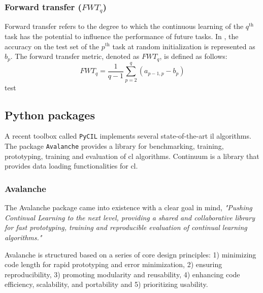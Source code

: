 \subsubsection{Forward transfer ($FWT_{q}$)}
Forward transfer refers to the degree to which the continuous learning of the $q^{\text{th}}$ task has the potential to influence the performance of future tasks. In \citep{lopez2017gradient}, the accuracy on the test set of the $p^{\text{th}}$ task at random initialization is represented as $b_{p}$. The forward transfer metric, denoted as $FWT_{q}$, is defined as follows: \begin{equation} FWT_{q} = \frac{1}{q-1} \sum_{p=2}^{q} (a_{p-1,p} - b_{p}) \end{equation}
\citep{wang2023comprehensive}test

\subsection{Python packages}
A recent toolbox called \verb|PyCIL| \citep{zhou2023class, zhou2023pycil} implements several state-of-the-art \acrshort{il} algorithms. The package \verb|Avalanche| \citep{lomonaco2021avalanche} provides a library for benchmarking, training, prototyping, training and evaluation of \acrshort{cl} algorithms. Continuum \citep{douillardlesort2021continuum} is a library that provides data loading functionalities for \acrshort{cl}. 

\subsubsection{Avalanche}
\label{sec:avalanche}
The Avalanche package came into existence with a clear goal in mind, \textit{"Pushing Continual Learning to the next level, providing a shared and collaborative library for fast prototyping, training and reproducible evaluation of continual learning algorithms."} \citep{avalancheContinualAIFiveMinutes}

Avalanche is structured based on a series of core design principles: 1) minimizing code length for rapid prototyping and error minimization, 2) ensuring reproducibility, 3) promoting modularity and reusability, 4) enhancing code efficiency, scalability, and portability and 5) prioritizing usability.


